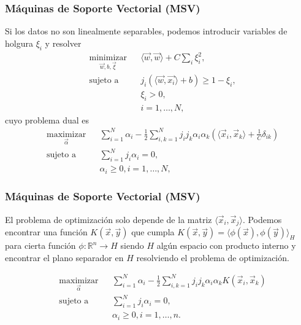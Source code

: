 \documentclass{beamer}
\begin{document}
\begin{frame}
\frametitle{Máquinas de Soporte Vectorial (MSV)}
Si los datos no son linealmente separables, podemos introducir variables de holgura $\xi_i$ y resolver
\begin{equation*}
  \begin{aligned}
    & \underset{\vec{w},b, \vec{\xi}}{\text{minimizar}}
    & & \langle \vec{w}, \vec{w} \rangle +C\sum_i\xi_i^2,\\
    & \text{sujeto a}
    & & j_i(\langle \vec{w}, \vec{x_i}\rangle + b)\geq 1-\xi_i, \\
    & & & \xi_i>0, \\
    & & & i = 1, \ldots, N,
  \end{aligned}
\end{equation*}
cuyo problema dual es
\begin{equation*}\label{eq:problemaOptimizacionDualMSV}
  \begin{aligned}
    & \underset{\vec{\alpha}}{\text{maximizar}}
    & & \sum_{i=1}^N \alpha_i -\frac{1}{2}\sum_{i,k=1}^Nj_ij_k\alpha_i\alpha_k\left( \langle\vec{x}_i, \vec{x}_k\rangle + \frac{1}{C}\delta_{ik}  \right)\\
    & \text{sujeto a}
    & & \sum_{i=1}^Nj_i\alpha_i = 0, \\
    & & & \alpha_i \geq 0, i = 1,\dots,N,
  \end{aligned}
\end{equation*}
\end{frame} 


\begin{frame}
\frametitle{Máquinas de Soporte Vectorial (MSV)}
El problema de optimización solo depende de la matriz $\langle \vec{x}_i, \vec{x}_j\rangle$. Podemos encontrar una función $K(\vec{x}, \vec{y})$ que cumpla $K(\vec{x}, \vec{y}) = \langle \phi(\vec{x}) , \phi(\vec{y})\rangle_{H}$ para cierta función $\phi:\mathbb{R}^n\rightarrow H$ siendo $H$ algún espacio con producto interno y encontrar el plano separador en $H$ resolviendo el problema de optimización.

\begin{equation*}\label{eq:problemaOptimizacionDualKernelMSV}
  \begin{aligned}
    & \underset{\vec{\alpha}}{\text{maximizar}}
    & & \sum_{i=1}^N \alpha_i -\frac{1}{2}\sum_{i,k=1}^Nj_ij_k\alpha_i\alpha_k K\left(\vec{x}_i, \vec{x}_k\right)\\
    & \text{sujeto a}
    & & \sum_{i=1}^Nj_i\alpha_i = 0, \\
    & & & \alpha_i \geq 0 , i = 1,\dots,n. 
  \end{aligned}
\end{equation*}
\end{frame}
\end{document}
